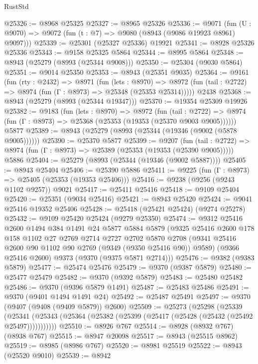 \begin{lexlean}{RustStd}
\begin{coremodule}
@25326 := @8968 @25325
@25327 := @8965 @25326
@25336 := @9071
    (fun (U : @9070) => @9072 (fun (t : @7) => @9080 (@8943 (@9086 @19923 @8961) @9097)))
@25339 := @25301 (@25327 @25336) @19921
@25341 := @8928 @25326 @25336
@25343 := @9158 @25325 @5864
@25344 := @8995 @5864
@25348 := @8943 (@25279 (@8993 (@25344 @9008)))
@25350 := @25304 (@9030 @5864)
@25351 := @9014 @25350
@25353 := @8943 (@25351 @9035)
@25364 := @9161
    (fun (rty : @2432) =>
    @8971
      (fun (lets : @8970) =>
      @8972 (fun (tail : @2722) => @8974 (fun (Γ : @8973) => @25348 (@25353 @25314)))))
    @2438
@25368 := @8943 (@25279 (@8993 (@25344 @19347)))
@25370 := @19354 @25309 @19926
@25382 := @9183
    (fun (lets : @8970) =>
    @8972
      (fun (tail : @2722) =>
      @8974 (fun (Γ : @8973) => @25368 (@25353 (@19353 (@25370 @9003 @9005))))))
    @5877
@25389 := @8943 (@25279 (@8993 (@25344 (@19346 (@9002 (@5878 @9005))))))
@25390 := @25370 @5877
@25399 := @9207
    (fun (tail : @2722) => @8974 (fun (Γ : @8973) => @25389 (@25353 (@19353 (@25390 @9005)))))
    @5886
@25404 := @25279 (@8993 (@25344 (@19346 (@9002 @5887))))
@25405 := @8943 @25404
@25406 := @25390 @5886
@25411 := @9225 (fun (Γ : @8973) => @25405 (@25353 (@19353 @25406)))
@25416 := @9238 (@9256 (@9243 @1102 @9257)) @9021
@25417 := @25411 @25416
@25418 := @9109 @25404
@25420 := @25351 (@9034 @25416)
@25421 := @8943 @25420
@25424 := @9041 @25416 @19352 @25406
@25428 := @25418 (@25421 @25424) (@9274 @25278)
@25432 := @9109 @25420 @25424 (@9279 @25350)
@25474 := @9312
    @25416
    @2600
    @1494
    @384
    @1491
    @24
    @5877
    @5884
    @5879
    (@9325
      @25416
      @2600
      @178
      @158
      @1102
      @27
      @2769
      @2714
      @2727
      @2702
      @5870
      @2708
      (@9341 @25416 @2600 @90 @1102 @90 @2769 (@9349 (@9350 @25416 @90)) @9589)
      (@9366 @25416 @2600)
      @9373
      (@9370 (@9375 @5871 @2714)))
@25476 := @9382 (@9383 @5879)
@25477 := @25474 @25476
@25479 := @9370 (@9387 @5879)
@25480 := @25477 @25479
@25482 := @9370 (@9392 @5879)
@25483 := @25480 @25482
@25486 := @9370 (@9396 @5879 @1491)
@25487 := @25483 @25486
@25491 := @9370 (@9401 @1494 @1491 @24)
@25492 := @25487 @25491
@25497 := @9370 (@9407 (@9408 (@9409 @5879)) @2600)
@25509 := @25273
    (@25298
      (@25339
        (@25341 (@25343 (@25364 (@25382 (@25399 (@25417 (@25428 (@25432 (@25492 @25497)))))))))))
@25510 := @8926 @767
@25514 := @8928 (@8932 @767) (@8938 @767)
@25515 := @8947 @20098
@25517 := @8943 (@25515 @8962)
@25519 := @8985 (@8986 @767)
@25520 := @8981 @25519
@25522 := @8943 (@25520 @9010)
@25539 := @8942

\end{coremodule}
\end{lexlean}
